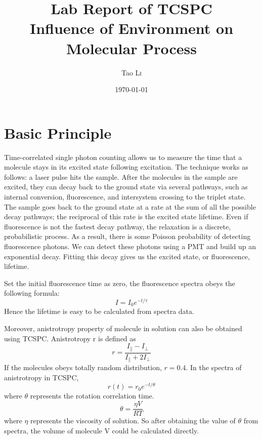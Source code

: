 \documentclass{article}
\title{Lab Report of TCSPC \\ Influence of Environment on Molecular Process} %
\author{Tao \textsc{Li}} %
\date{\today} %
\begin{document}
\maketitle %



 
\section{Basic Principle}
Time-correlated single photon counting allows us to measure the time that a molecule stays in its excited state following excitation. The technique works as follows: a laser pulse hits the sample.  After the molecules in the sample are excited, they can decay back to the ground state via several pathways, such as internal conversion, fluorescence, and intersystem crossing to the triplet state.  The sample goes back to the ground state at a rate at the sum of all the possible decay pathways; the reciprocal of this rate is the excited state lifetime. Even if fluorescence is not the fastest decay pathway, the relaxation is a discrete, probabilistic process.  As a result, there is some Poisson probability of detecting fluorescence photons.  We can detect these photons using a PMT and build up an exponential decay.  Fitting this decay gives us the excited state, or fluorescence, lifetime. \par 
Set the initial fluorescence time as zero, the fluorescence spectra obeys the following formula:
\begin{equation}
I=I_{0}e^{-t/\tau}
\end{equation}
Hence the lifetime is easy to be calculated from spectra data.\par 
Moreover, anistrotropy property of molecule in solution can also be obtained using TCSPC. Anistrotropy r is defined as
\begin{equation} 
r=\frac{I_{\parallel}-I_{\perp}}{I_{\parallel}+2I_{\perp}}
\end{equation}\label{r}
If the molecules obeys totally random distribution, $r=0.4$. In the spectra of anistrotropy in TCSPC, 
\begin{equation}
r(t)=r_{0}e^{-t/\theta}
\end{equation}\label{r2}
where $\theta$ represents the rotation correlation time.
\begin{equation}
\theta =\frac{\eta V}{RT}
\end{equation}
where $\eta$ represents the viscosity of solution. So after obtaining the value of $\theta$ from spectra, the volume of molecule V could be calculated directly.
\end{document}
